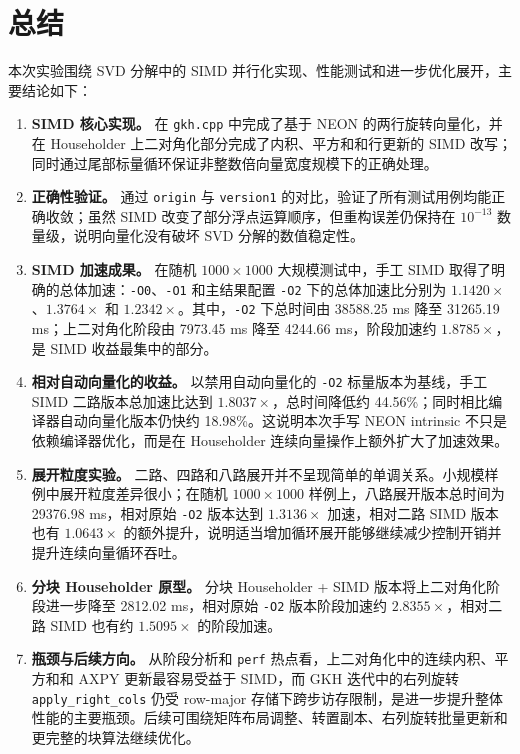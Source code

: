 \documentclass[UTF8,a4paper]{ctexart}
\begin{document}
\section{总结}
本次实验围绕 SVD 分解中的 SIMD 并行化实现、性能测试和进一步优化展开，主要结论如下：
\begin{enumerate}
  \item \textbf{SIMD 核心实现。} 在 \texttt{gkh.cpp} 中完成了基于 NEON 的两行旋转向量化，并在 Householder 上二对角化部分完成了内积、平方和和行更新的 SIMD 改写；同时通过尾部标量循环保证非整数倍向量宽度规模下的正确处理。
  \item \textbf{正确性验证。} 通过 \texttt{origin} 与 \texttt{version1} 的对比，验证了所有测试用例均能正确收敛；虽然 SIMD 改变了部分浮点运算顺序，但重构误差仍保持在 \(10^{-13}\) 数量级，说明向量化没有破坏 SVD 分解的数值稳定性。
  \item \textbf{SIMD 加速成果。} 在随机 \(1000\times1000\) 大规模测试中，手工 SIMD 取得了明确的总体加速：\texttt{-O0}、\texttt{-O1} 和主结果配置 \texttt{-O2} 下的总体加速比分别为 \(1.1420\times\)、\(1.3764\times\) 和 \(1.2342\times\)。其中，\texttt{-O2} 下总时间由 38588.25 ms 降至 31265.19 ms；上二对角化阶段由 7973.45 ms 降至 4244.66 ms，阶段加速约 \(1.8785\times\)，是 SIMD 收益最集中的部分。
  \item \textbf{相对自动向量化的收益。} 以禁用自动向量化的 \texttt{-O2} 标量版本为基线，手工 SIMD 二路版本总加速比达到 \(1.8037\times\)，总时间降低约 44.56\%；同时相比编译器自动向量化版本仍快约 18.98\%。这说明本次手写 NEON intrinsic 不只是依赖编译器优化，而是在 Householder 连续向量操作上额外扩大了加速效果。
  \item \textbf{展开粒度实验。} 二路、四路和八路展开并不呈现简单的单调关系。小规模样例中展开粒度差异很小；在随机 \(1000\times1000\) 样例上，八路展开版本总时间为 29376.98 ms，相对原始 \texttt{-O2} 版本达到 \(1.3136\times\) 加速，相对二路 SIMD 版本也有 \(1.0643\times\) 的额外提升，说明适当增加循环展开能够继续减少控制开销并提升连续向量循环吞吐。
  \item \textbf{分块 Householder 原型。} 分块 Householder + SIMD 版本将上二对角化阶段进一步降至 2812.02 ms，相对原始 \texttt{-O2} 版本阶段加速约 \(2.8355\times\)，相对二路 SIMD 也有约 \(1.5095\times\) 的阶段加速。
  \item \textbf{瓶颈与后续方向。} 从阶段分析和 \texttt{perf} 热点看，上二对角化中的连续内积、平方和和 AXPY 更新最容易受益于 SIMD，而 GKH 迭代中的右列旋转 \texttt{apply\_right\_cols} 仍受 row-major 存储下跨步访存限制，是进一步提升整体性能的主要瓶颈。后续可围绕矩阵布局调整、转置副本、右列旋转批量更新和更完整的块算法继续优化。
\end{enumerate}
\end{document}
